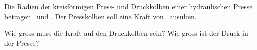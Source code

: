 Die Radien der kreisförmigen Press- und Druckkolben einer hydraulischen Presse betragen \RhpO\ und \rhpO. Der Presskolben soll eine Kraft von \FhpO\ ausüben.

\begin{abcliste}
\abc Wie gross muss die Kraft auf den Druckkolben sein?
\abc Wie gross ist der Druck in der Presse?
\end{abcliste}
